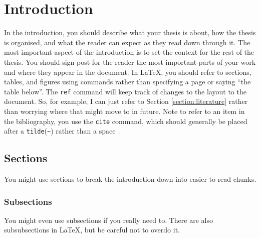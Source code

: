 
\chapter{Introduction}
\label{section:introduction}

In the introduction, you should describe what your thesis is about, how the
thesis is organised, and what the reader can expect as they read down through
it.
The most important aspect of the introduction is to set the context for the
rest of the thesis.
You should sign-post for the reader the most important parts of your work and
where they appear in the document.
In \LaTeX, you should refer to sections, tables, and figures using commands
rather than specifying a page or saying ``the table below''. The \texttt{ref}
command will keep track of changes to the layout to the document. So, for
example, I can just refer to Section \ref{section:literature} rather than
worrying where that might move to in future.
Note to refer to an item in the bibliography, you use the \texttt{cite} command,
which should generally be placed after a \texttt{tilde}(\texttt{\~}) rather than
a space~\cite{einstein}.


\section{Sections}
You might use sections to break the introduction down into easier to read
chunks.
\lipsum[1-2]

\subsection{Subsections}
You might even use subsections if you really need to.
There are also subsubsections in \LaTeX, but be careful not to overdo it.

\lipsum[1-2]
